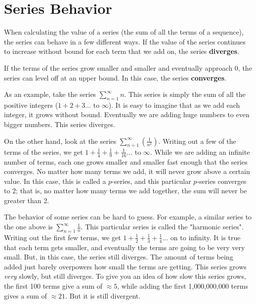 \documentclass[12pt]{report}
\begin{document}
\clearpage

\section{Series Behavior}
When calculating the value of a series (the sum of all the terms of a sequence), the series can behave in a few different ways. If the value of the series continues to increase without bound for each term that we add on, the series \textbf{diverges}.

If the terms of the series grow smaller and smaller and eventually approach 0, the series can level off at an upper bound. In this case, the series \textbf{converges}.

As an example, take the series $ \sum_{n=1}^{\infty} n $. This series is simply the sum of all the positive integers ($1 + 2 + 3...$ to $\infty$). It is easy to imagine that as we add each integer, it grows without bound. Eventually we are adding huge numbers to even bigger numbers. This series diverges.

On the other hand, look at the series $ \sum_{n=1}^{\infty} \left( \frac{1}{n^2} \right) $. Writing out a few of the terms of the series, we get $ 1 + \frac{1}{4} + \frac{1}{9} + \frac{1}{16} ...$ to $ \infty $. While we are adding an infinite number of terms, each one grows smaller and smaller fast enough that the series converges. No matter how many terms we add, it will never grow above a certain value. In this case, this is called a $p$-series, and this particular $p$-series converges to 2; that is, no matter how many terms we add together, the sum will never be greater than 2.

The behavior of some series can be hard to guess. For example, a similar series to the one above is $ \sum_{n=1}^{\infty} \frac{1}{n} $. This particular series is called the "harmonic series". Writing out the first few terms, we get $ 1 + \frac{1}{2} + \frac{1}{3} + \frac{1}{4} ... $ on to infinity. It is true that each term gets smaller, and eventually the terms are going to be very very small. But, in this case, the series still diverges. The amount of terms being added just barely overpowers how small the terms are getting. This series grows \textit{very} slowly, but still diverges. To give you an idea of how slow this series grows, the first 100 terms give a sum of $ \approx 5 $, while adding the first 1,000,000,000 terms gives a sum of $ \approx 21 $. But it is still divergent.


\clearpage
\end{document}

